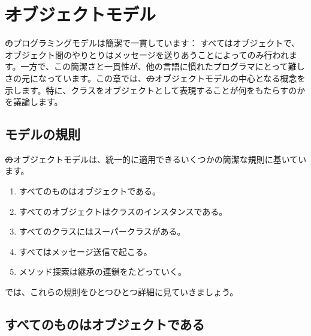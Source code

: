 \documentclass[a4paper,10pt,twoside]{book}
\begin{document}
	\renewcommand{\nnbb}[2]{} %
	\sloppy
\fi
\chapter{\st オブジェクトモデル}

\st のプログラミングモデルは簡潔で一貫しています： すべてはオブジェクトで、オブジェクト間のやりとりはメッセージを送りあうことによってのみ行われます。一方で、この簡潔さと一貫性が、他の言語に慣れたプログラマにとって難しさの元になっています。この章では、\st のオブジェクトモデルの中心となる概念を示します。特に、クラスをオブジェクトとして表現することが何をもたらすのかを議論します。

\section{モデルの規則}

\st のオブジェクトモデルは、統一的に適用できるいくつかの簡潔な規則に基いています。

\begin{enumerate}[label={\textbf{Rule \arabic{*}}.}, ref={Rule \arabic{*}}, leftmargin=*]
\item{} 
	すべてのものはオブジェクトである。

\item{} 
	すべてのオブジェクトはクラスのインスタンスである。

\item{}  
	すべてのクラスにはスーパークラスがある。

\item{}  
	すべてはメッセージ送信で起こる。

\item{}  
	メソッド探索は継承の連鎖をたどっていく。

\end{enumerate}

\noindent
では、これらの規則をひとつひとつ詳細に見ていきましょう。


\section{すべてのものはオブジェクトである}
\end{document}
